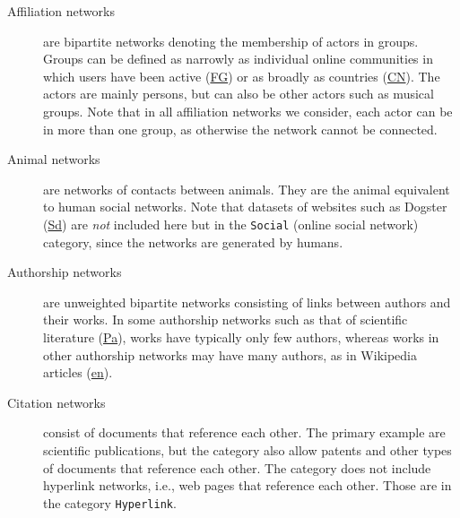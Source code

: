 \documentclass{article}
\begin{document}
%
%
\begin{description}
\item[Affiliation networks] are bipartite networks denoting the
  membership of actors in groups.  Groups can be defined as narrowly as
  individual online communities in which users have been active
  (\href{http://konect.cc/networks/flickr-groupmemberships/}{\textsf{FG}})
  or as broadly as countries
  (\href{http://konect.cc/networks/dbpedia-country/}{\textsf{CN}}). The
  actors are mainly persons, but can also be other actors such as musical
  groups. Note that in all affiliation networks we consider, each actor
  can be in more than one group, as otherwise the network cannot be
  connected.

\item[Animal networks] are networks of contacts between animals.  
  They are the animal equivalent to human social networks.  Note that
  datasets of websites such as Dogster
  (\href{http://konect.cc/networks/petster-friendships-dog/}{\textsf{Sd}})
  are \emph{not} included here but in the \texttt{Social} (online social
  network) category, since the networks are generated by humans. 

\item[Authorship networks] are unweighted bipartite networks consisting
  of links between authors and their works.  In some authorship networks
  such as that of scientific literature
  (\href{http://konect.cc/networks/dblp-author/}{\textsf{Pa}}),
  works have typically only few authors, whereas works in other
  authorship networks may have many authors, as in Wikipedia articles
    (\href{http://konect.cc/networks/edit-enwiki/}{\textsf{en}}).

\item[Citation networks] consist of documents that reference each
  other.  The primary example are scientific publications, but the
  category also allow patents and other types of documents that
  reference each other.  The category does not include hyperlink
  networks, i.e., web pages that reference each other.  Those are in the
  category \texttt{Hyperlink}. 


\end{description}
\end{document}
